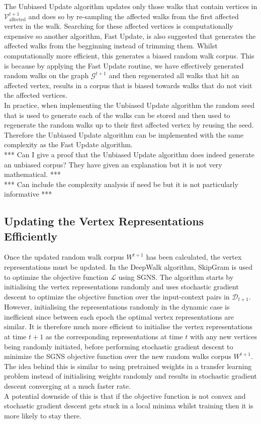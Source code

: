 \documentclass[a4paper]{article}
\newcommand{\D}{\mathcal D}
\renewcommand{\G}{\mathcal G}
\renewcommand{\V}{\mathcal V}
\begin{document}
The Unbiased Update algorithm updates only those walks that contain vertices in
$\V^{t+1}_{\text{affected}}$ and does so by re-sampling the affected walks from
the first affected vertex in the walk. Searching for these affected vertices is computationally expensive so another algorithm,
Fast Update, is also suggested that generates the affected walks from the
begginning instead of trimming them. Whilst computationally more efficient, this
generates a biased random walk corpus. This is because by applying the Fast Update routine, we have
effectively generated random walks on the graph $\G^{t+1}$ and then regenerated
all walks that hit an affected vertex, results in a corpus that is biased towards walks
that do not visit the affected vertices.\\
In practice, when implementing the Unbiased Update algorithm the random seed
that is used to generate each of the walks can be stored and then used to
regenerate the random walks up to their first affected vertex by reusing the
seed. Therefore the Unbiased Update algorithm can be implemented with the same
complexity as the Fast Update algorithm.\\
*** Can I give a proof that the Unbiased Update algorithm does indeed generate
an unbiased corpus? They have given an explanation but it is not very
mathematical. ***\\
*** Can include the complexity analysis if need be but it is not particularly
informative ***

\subsection{Updating the Vertex Representations Efficiently}
Once the updated random walk corpus $W^{t+1}$ has been calculated, the vertex
representations must be updated. In the DeepWalk algorithm, SkipGram is used to
optimize the objective function $\mathcal{L}$ using SGNS.
The algorithm starts by initialising the vertex representations randomly and
uses stochastic gradient descent to optimize the objective function over the
input-context pairs in $\D_{t+1}$.\\
However, initialising the representations randomly in the dynamic case is
inefficient since between each epoch the optimal vertex representations are
similar. It is therefore much more efficient to initialise the vertex
representations at time $t+1$ as the corresponding representations at time $t$
with any new vertices being randomly initiated, before performing stochastic gradient
descent to minimize the SGNS objective function over the new random walks corpus
$W^{t+1}$. The idea behind this is similar to using pretrained weights in a transfer
learning problem instead of initialising weights randomly and results in
stochastic gradient descent converging at a much faster rate.\\
A potential downside of this is that if the objective function is not convex and
stochastic gradient descent gets stuck in a local minima whilst training then it
is more likely to stay there.\\
\end{document}
